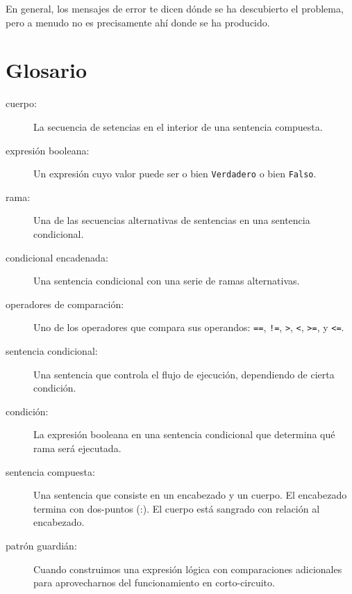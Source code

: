 
En general, los mensajes de error te dicen dónde se ha descubierto el problema,
pero a menudo no es precisamente ahí donde se ha producido.


\section{Glosario}

\begin{description}

\item[cuerpo:] La secuencia de setencias en el interior de una sentencia compuesta.

\item[expresión booleana:]  Un expresión cuyo valor puede ser o bien 
{\tt Verdadero} o bien {\tt Falso}.

\item[rama:] Una de las secuencias alternativas de sentencias en una
sentencia condicional.

\item[condicional encadenada:]  Una sentencia condicional con una serie
de ramas alternativas.

\item[operadores de comparación:] Uno de los operadores que compara
sus operandos: {\tt ==}, {\tt !=}, {\tt >}, {\tt <}, {\tt >=}, y {\tt <=}.

\item[sentencia condicional:]  Una sentencia que controla el flujo de
ejecución, dependiendo de cierta condición.

\item[condición:] La expresión booleana en una sentencia condicional
que determina qué rama será ejecutada.

\item[sentencia compuesta:]  Una sentencia que consiste en un encabezado
y un cuerpo. El encabezado termina con dos-puntos (:). El cuerpo está sangrado
con relación al encabezado.

\item[patrón guardián:] Cuando construimos una expresión lógica
con comparaciones adicionales
para aprovecharnos del funcionamiento en corto-circuito.


\end{description}
